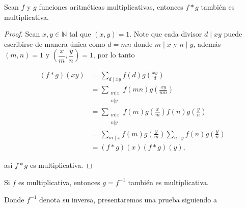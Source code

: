 \begin{theorem}
Sean $f$ y $g$ funciones aritméticas multiplicativas, entonces $f * g$ también es multiplicativa.
\end{theorem}

\begin{proof}
Sean $x, y \in \mathbb{N}$ tal que $(x, y)=1$. Note que cada divisor $d \mid xy$ puede escribirse de manera única como $d=mn$ donde $m \mid x$ y $n \mid y$, además $(m, n)=1$ y $\left(\dfrac{x}{m}, \dfrac{y}{n}\right)=1$, por lo tanto

$$
\begin{aligned}
(f * g)(xy) & =\sum_{d \mid xy} f(d) g\left(\frac{xy}{d}\right) \\
& =\sum_{\substack{m|x \\
n| y}} f(mn) g\left(\frac{xy}{mn}\right) \\
& =\sum_{\substack{m|x \\
n| y}} f(m) g\left(\frac{x}{m}\right) f(n) g\left(\frac{y}{n}\right) \\
& =\sum_{m \mid x} f(m) g\left(\frac{y}{m}\right) \sum_{n \mid y} f(n) g\left(\frac{y}{n}\right) \\
& =(f * g)(x)(f * g)(y) ,
\end{aligned}
$$

así $f * g$ es multiplicativa.
\end{proof}


\begin{theorem}
Si $f$ es multiplicativa, entonces $g=f^{-1}$ también es multiplicativa.
\end{theorem}

Donde $f^{-1}$ denota su inversa, presentaremos una prueba siguiendo a \cite{hildebrand2006introduction}\\

